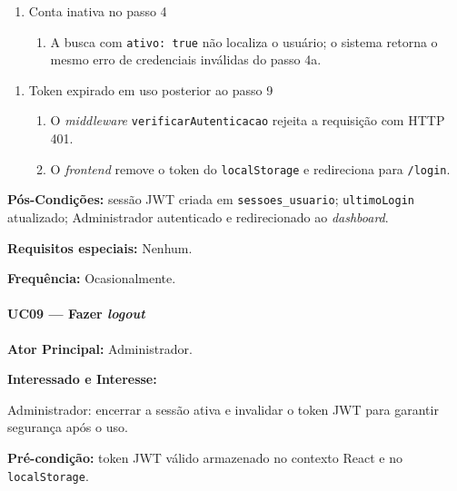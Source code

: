 \begin{enumerate}
  \renewcommand{\theenumi}{4b}
  \renewcommand{\labelenumi}{\theenumi.}
  \item Conta inativa no passo 4
  \begin{enumerate}
  \item A busca com \texttt{ativo: true} não localiza o
        usuário; o sistema retorna o mesmo erro de
        credenciais inválidas do passo 4a.
  \end{enumerate}
\end{enumerate}

\begin{enumerate}
  \renewcommand{\theenumi}{9a}
  \renewcommand{\labelenumi}{\theenumi.}
  \item Token expirado em uso posterior ao passo 9
  \begin{enumerate}
  \item O \textit{middleware} \texttt{verificarAutenticacao}
        rejeita a requisição com HTTP 401.
  \item O \textit{frontend} remove o token do
        \texttt{localStorage} e redireciona para
        \texttt{/login}.
  \end{enumerate}
\end{enumerate}

\textbf{Pós-Condições:} sessão JWT criada em
\texttt{sessoes\_usuario}; \texttt{ultimoLogin} atualizado;
Administrador autenticado e redirecionado ao \textit{dashboard}.

\textbf{Requisitos especiais:} Nenhum.

\textbf{Frequência:} Ocasionalmente.

\paragraph{UC09 --- Fazer \textit{logout}}\hfill\break

\textbf{Ator Principal:} Administrador.

\textbf{Interessado e Interesse:}

Administrador: encerrar a sessão ativa e invalidar o token
JWT para garantir segurança após o uso.

\textbf{Pré-condição:} token JWT válido armazenado no contexto
React e no \texttt{localStorage}.

